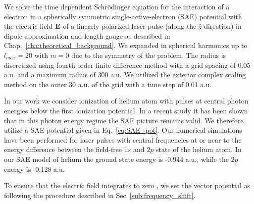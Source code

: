 We solve the time dependent Schr\"odinger equation for the interaction of a electron in a spherically symmetric single-active-electron (SAE) potential with the electric field ${\bf E}$ of a linearly polarized laser pulse (along the ${\hat z}$-direction) in dipole approximation and length gauge as described in Chap.~\ref{cha:theoretical_background}. We expanded in spherical harmonics up to $l_{max} = 20$ with $m=0$ due to the symmetry of the problem. The radius is discretized using fourth order finite difference method with a grid spacing of 0.05 a.u. and a maximum radius of 300 a.u. We utilized the exterior complex scaling method on the outer 30 a.u. of the grid with a time step of  0.01 a.u.

In our work we consider ionization of helium atom with pulses at central photon energies below the first ionization potential. In a recent study \cite{boll2019} it has been shown that in this photon energy regime the SAE picture remains valid. We therefore utilize a SAE potential given in Eq.~\ref{eq:SAE_pot}.
Our numerical simulations have been performed for laser pulses with central frequencies at or near to the energy difference between the field-free $1s$ and $2p$ state of the helium atom. In our SAE model of helium the ground state energy is -0.944 a.u., while the $2p$ energy is -0.128 a.u.

To ensure that the electric field 
integrates to zero \cite{chelkowski2002}, we set the vector potential as following the procedure described in Sec~\ref{sub:frequency_shift}.

